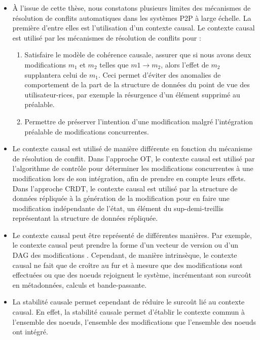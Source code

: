 \begin{itemize}
    \item À l'issue de cette thèse, nous constatons plusieurs limites des mécanismes de résolution de conflits automatiques dans les systèmes \ac{P2P} à large échelle.
        La première d'entre elles est l'utilisation d'un contexte causal.
        Le contexte causal est utilisé par les mécanismes de résolution de conflits pour :
        \begin{enumerate}
            \item Satisfaire le modèle de cohérence causale, \ie assurer que si nous avons deux modifications $m_1$ et $m_2$ telles que $m1 \to m_2$, alors l'effet de $m_2$ supplantera celui de $m_1$.
                Ceci permet d'éviter des anomalies de comportement de la part de la structure de données du point de vue des utilisateur-rices, par exemple la résurgence d'un élément supprimé au préalable.
            \item Permettre de préserver l'intention d'une modification malgré l'intégration préalable de modifications concurrentes.
        \end{enumerate}
    \item Le contexte causal est utilisé de manière différente en fonction du mécanisme de résolution de conflit.
        Dans l'approche \ac{OT}, le contexte causal est utilisé par l'algorithme de contrôle pour déterminer les modifications concurrentes à une modification lors de son intégration, afin de prendre en compte leurs effets.
        Dans l'approche \ac{CRDT}, le contexte causal est utilisé par la structure de données répliquée à la génération de la modification pour en faire une modification indépendante de l'état, \ie un élément du sup-demi-treillis représentant la structure de données répliquée.
    \item Le contexte causal peut être représenté de différentes manières.
        Par exemple, le contexte causal peut prendre la forme d'un vecteur de version \cite{1988-version-vector-mattern,1991-version-vector-fidge} ou d'un \ac{DAG} des modifications \cite{1997-causal-barrier}.
        Cependant, de manière intrinsèque, le contexte causal ne fait que de croître au fur et à mesure que des modifications sont effectuées ou que des noeuds rejoignent le système, incrémentant son surcoût en métadonnées, calculs et bande-passante.
    \item La stabilité causale permet cependant de réduire le surcoût lié au contexte causal.
        En effet, la stabilité causale permet d'établir le contexte commun à l'ensemble des noeuds, \ie l'ensemble des modifications que l'ensemble des noeuds ont intégré.

\end{itemize}
